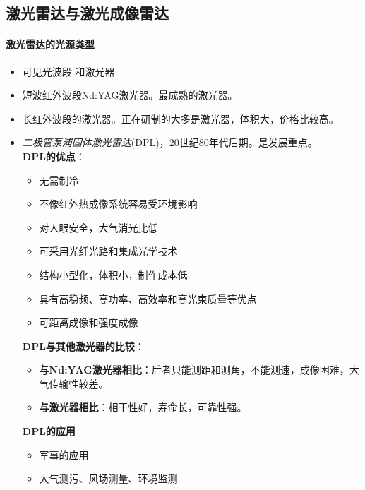 \subsection{激光雷达与激光成像雷达}
\paragraph{激光雷达的光源类型}\begin{itemize}
	\item 可见光波段{\kaishu {}-和激光器}
	\item 短波红外波段{\kaishu Nd:YAG激光器}。最成熟的激光器。
	\item 长红外波段的{\kaishu {}激光器}。正在研制的大多是激光器，体积大，价格比较高。
	\item \textit{二极管泵浦固体激光雷达}(DPL)，20世纪80年代后期。是发展重点。\\
	\textbf{DPL的优点}：\begin{itemize}
		\item 无需制冷
		\item 不像红外热成像系统容易受环境影响
		\item 对人眼安全，大气消光比低
		\item 可采用光纤光路和集成光学技术
		\item 结构小型化，体积小，制作成本低
		\item 具有高稳频、高功率、高效率和高光束质量等优点
		\item 可距离成像和强度成像
	\end{itemize}
	\textbf{DPL与其他激光器的比较}：\begin{itemize}
		\item \textbf{与Nd:YAG激光器相比}：后者只能测距和测角，不能测速，成像困难，大气传输性较差。
		\item \textbf{与激光器相比}：相干性好，寿命长，可靠性强。
	\end{itemize}
	\textbf{DPL的应用}\begin{itemize}
		\item 军事的应用
		\item 大气测污、风场测量、环境监测
	\end{itemize}
\end{itemize}
